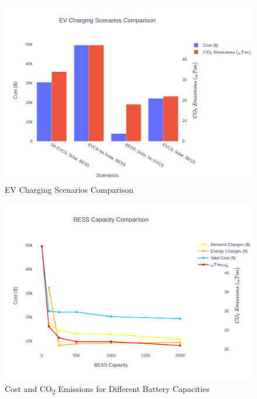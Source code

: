 \documentclass[conference]{IEEEtran}
\begin{document}
	\begin{figure}
		\centering
		\includegraphics[width=1\linewidth]{Fig/mg_scene_comparison}
		\caption{EV Charging Scenarios Comparison}
		\label{fig:mgscenecomparison}
	\end{figure}
	\begin{figure}
		\centering
		\includegraphics[width=1\linewidth]{Fig/bess_capacity_comparison}
		\caption{Cost and CO\textsubscript{2} Emissions for Different Battery Capacities}
		\label{fig:besscapacitycomparison}
	\end{figure}
\end{document}
